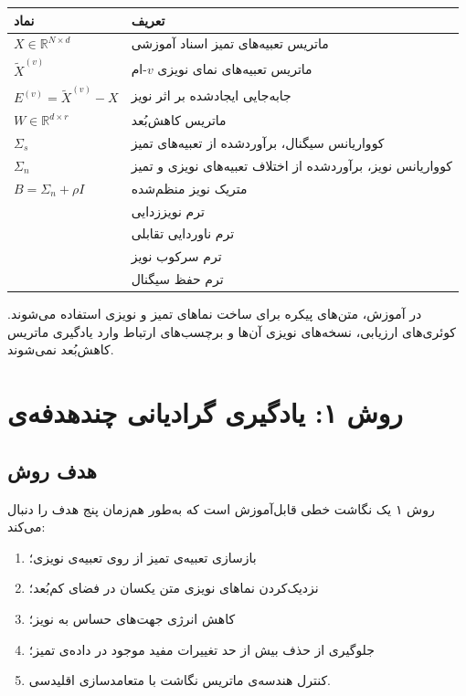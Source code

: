 \documentclass[a4paper,12pt]{article}
\newcommand{\NPone}{\lr{NoiseProj1}}
\newcommand{\Dterm}{\lr{D}}
\newcommand{\Iterm}{\lr{I}}
\newcommand{\Nterm}{\lr{N}}
\newcommand{\Sterm}{\lr{S}}
\begin{document}
\begin{center}
\begin{tabularx}{0.95\textwidth}{|C{2.4cm}|X|}
\hline
\textbf{نماد} & \textbf{تعریف} \\
\hline
$X\in\mathbb{R}^{N\times d}$ & ماتریس تعبیه‌های تمیز اسناد آموزشی \\
\hline
$\widetilde{X}^{(v)}$ & ماتریس تعبیه‌های نمای نویزی $v$-ام \\
\hline
$E^{(v)}=\widetilde{X}^{(v)}-X$ & جابه‌جایی ایجادشده بر اثر نویز \\
\hline
$W\in\mathbb{R}^{d\times r}$ & ماتریس کاهش‌بُعد \\
\hline
$\Sigma_s$ & کوواریانس سیگنال، برآوردشده از تعبیه‌های تمیز \\
\hline
$\Sigma_n$ & کوواریانس نویز، برآوردشده از اختلاف تعبیه‌های نویزی و تمیز \\
\hline
$B=\Sigma_n+\rho I$ & متریک نویز منظم‌شده \\
\hline
\Dterm{} & ترم نویززدایی \\
\hline
\Iterm{} & ترم ناوردایی تقابلی \\
\hline
\Nterm{} & ترم سرکوب نویز \\
\hline
\Sterm{} & ترم حفظ سیگنال \\
\hline
\end{tabularx}
\end{center}

در آموزش، متن‌های پیکره برای ساخت نماهای تمیز و نویزی استفاده می‌شوند. کوئری‌های ارزیابی، نسخه‌های نویزی آن‌ها و برچسب‌های ارتباط وارد یادگیری ماتریس کاهش‌بُعد نمی‌شوند.

\section{روش ۱: یادگیری گرادیانی چندهدفه‌ی \NPone{}}

\subsection{هدف روش}

روش ۱ یک نگاشت خطی قابل‌آموزش است که به‌طور هم‌زمان پنج هدف را دنبال می‌کند:

\begin{enumerate}[label=\arabic*)]
 \item بازسازی تعبیه‌ی تمیز از روی تعبیه‌ی نویزی؛
 \item نزدیک‌کردن نماهای نویزی متن یکسان در فضای کم‌بُعد؛
 \item کاهش انرژی جهت‌های حساس به نویز؛
 \item جلوگیری از حذف بیش از حد تغییرات مفید موجود در داده‌ی تمیز؛
 \item کنترل هندسه‌ی ماتریس نگاشت با متعامدسازی اقلیدسی.
\end{enumerate}
\end{document}
